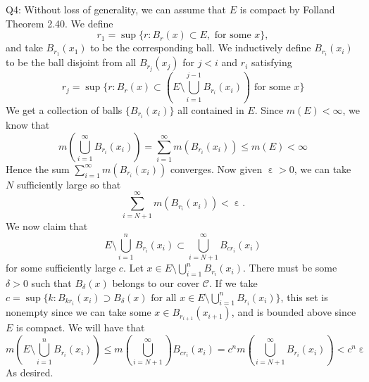 \documentclass[letterpaper]{article}
\DeclareMathOperator{\ep}{\varepsilon}
\begin{document}
\noindent Q4: Without loss of generality, we can assume that $E$ is compact by Folland Theorem 2.40. We define $$r_1 = \sup \{r: B_r(x)\subset E, \text{ for some $x$}  \},$$ and take $B_{r_1}(x_1)$ to be the corresponding ball. 
We inductively define $B_{r_i}(x_i)$ to be the ball disjoint from all $B_{r_j}(x_j)$ for $j<i$ and $r_i$ satisfying $$r_j = \sup \{r:B_r(x) \subset (E \setminus \bigcup_{i=1}^{j-1}B_{r_i}(x_i)) \text{ for some $x$}\}$$
We get a collection of balls $\{B_{r_i}(x_i)\}$ all contained in $E$. Since $m(E)< \infty$, we know that $$m(\bigcup_{i=1}^\infty B_{r_i}(x_i)) = \sum_{i=1}^\infty m(B_{r_i}(x_i)) \leq m(E) < \infty$$
Hence the sum $\sum_{i=1}^\infty m(B_{r_i}(x_i))$ converges. Now given $\ep >0$, we can take $N$ sufficiently large so that $$\sum_{i=N+1}^\infty m(B_{r_i}(x_i))<\ep. $$ We now claim that $$E \setminus \bigcup_{i=1}^n B_{r_i}(x_i) \subset \bigcup_{i=N+1}^\infty B_{cr_i}(x_i)$$ for some sufficiently large $c$.
 Let $x\in E \setminus \bigcup_{i=1}^n B_{r_i}(x_i)$. There must be some $\delta>0$ such that $B_\delta(x)$ belongs to our cover $\mathcal{C}$. If we take $c = \sup \{k:B_{kr_i}(x_i) \supset B_\delta(x) \text{ for all $x\in E \setminus \bigcup_{i=1}^n B_{r_i}(x_i)$} \}$, this set is nonempty since we can take some $x\in B_{r_{i+1}}(x_{i+1})$, and is bounded above since $E$ is compact. We will have that 
 $$m(E \setminus \bigcup_{i=1}^n B_{r_i}(x_i)) \leq m(\bigcup_{i=N+1}^\infty) B_{cr_i}(x_i) = c^n m(\bigcup_{i=N+1}^\infty B_{r_i}(x_i)) < c^n \ep$$
 As desired. 
\end{document}
